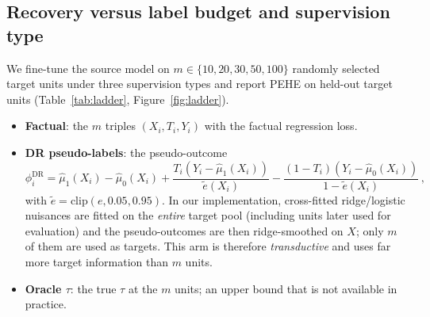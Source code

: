 \documentclass[pdflatex,sn-mathphys-num]{sn-jnl}
\begin{document}
\subsection{Recovery versus label budget and supervision type}
\label{sec:ladder}
We fine-tune the source model on $m\in\{10,20,30,50,100\}$ randomly selected target units under three supervision types and report PEHE on held-out target units (Table~\ref{tab:ladder}, Figure~\ref{fig:ladder}).
\begin{itemize}
  \item \textbf{Factual}: the $m$ triples $(X_i,T_i,Y_i)$ with the factual regression loss.
  \item \textbf{DR pseudo-labels}: the pseudo-outcome
  \begin{equation}
  \phi_i^{\mathrm{DR}}=\hat\mu_1(X_i)-\hat\mu_0(X_i)+\frac{T_i(Y_i-\hat\mu_1(X_i))}{\tilde e(X_i)}-\frac{(1-T_i)(Y_i-\hat\mu_0(X_i))}{1-\tilde e(X_i)}\,,
  \end{equation}
  with $\tilde e=\mathrm{clip}(e,0.05,0.95)$. In our implementation, cross-fitted ridge/logistic nuisances are fitted on the \emph{entire} target pool (including units later used for evaluation) and the pseudo-outcomes are then ridge-smoothed on $X$; only $m$ of them are used as targets. This arm is therefore \emph{transductive} and uses far more target information than $m$ units.
  \item \textbf{Oracle $\tau$}: the true $\tau$ at the $m$ units; an upper bound that is not available in practice.
\end{itemize}
\end{document}
